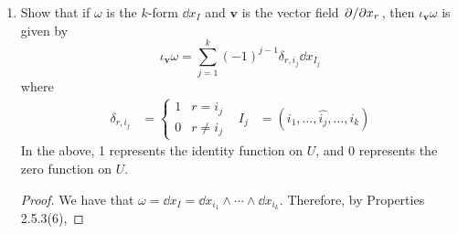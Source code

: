\documentclass[../psets.tex]{subfiles}
\begin{document}
\begin{enumerate}[label={\textbf{2.5.\roman*.}}]
\begin{enumerate}
\begin{proof}
            To prove that the above two forms are equal, it will suffice to show that they evaluate to identical elements of $\lam[k-1]{V^*}$ for all $p\in U$. Let $p\in U$ be arbitrary. Also let $(\mu_i)_p=\pi(\ell_i)$ for $i=1,\dots,k$ and, thus, $\omega_p=\pi(\ell_1\otimes\cdots\otimes\ell_k)$. Then
            \begin{align*}
                [\iota_{\bm{v}}\omega]_p &= \iota_{\bm{v}(p)}\omega_p\\
                &= \pi\left[ \iota_{\bm{v}(p)}(\ell_1\otimes\cdots\otimes\ell_k) \right]\\
                &= \pi\left[ \sum_{r=1}^k(-1)^{r-1}\ell_r(\bm{v}(p))\ell_1\otimes\cdots\otimes\hat{\ell}_r\otimes\cdots\otimes\ell_k \right]\tag*{Lemma 1.7.4}\\
                &= \sum_{r=1}^k(-1)^{r-1}\pi\left[ \iota_{\bm{v(p)}}(\ell_r)\ell_1\otimes\cdots\otimes\hat{\ell}_r\otimes\cdots\otimes\ell_k \right]\\
                &= \sum_{r=1}^k(-1)^{r-1}\iota_{\bm{v(p)}}(\mu_r)_p(\mu_1)_p\wedge\cdots\wedge\widehat{(\mu_r)_p}\wedge\cdots\wedge(\mu_k)_p\\
                &= \left[ \sum_{r=1}^k(-1)^{r-1}\iota_{\bm{v}}(\mu_r)\mu_1\wedge\cdots\wedge\widehat{\mu_r}\wedge\cdots\wedge\mu_k \right]_p
            \end{align*}
            as desired.
        \end{proof}
    \end{enumerate}
    \item Show that if $\omega$ is the $k$-form $\dd{x_I}$ and $\bm{v}$ is the vector field $\pdv*{x_r}$, then $\iota_{\bm{v}}\omega$ is given by
    \begin{equation*}
        \iota_{\bm{v}}\omega = \sum_{j=1}^k(-1)^{j-1}\delta_{r,i_j}\dd{x_{I_j}}
    \end{equation*}
    where
    \begin{align*}
        \delta_{r,i_j} &=
        \begin{cases}
            1 & r = i_j\\
            0 & r \neq i_j
        \end{cases}&
        I_j &= (i_1,\dots,\widehat{i_j},\dots,i_k)
    \end{align*}
    In the above, 1 represents the identity function on $U$, and 0 represents the zero function on $U$.
    \begin{proof}
        We have that $\omega=\dd{x_I}=\dd{x_{i_1}}\wedge\cdots\wedge\dd{x_{i_k}}$. Therefore, by Properties 2.5.3(6),

\end{proof}
\end{enumerate}
\end{document}
